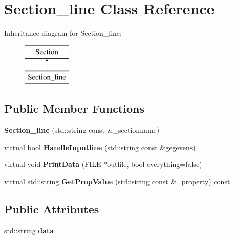 \hypertarget{classSection__line}{\section{Section\-\_\-line Class Reference}
\label{classSection__line}
}
Inheritance diagram for Section\-\_\-line\-:\begin{figure}[H]
\begin{center}
\leavevmode
\includegraphics[height=2.000000cm]{classSection__line}
\end{center}
\end{figure}
\subsection*{Public Member Functions}
\begin{DoxyCompactItemize}
\item 
\hypertarget{classSection__line_ab79823a6ed5b8580e8f197d0c546de55}{{\bfseries Section\-\_\-line} (std\-::string const \&\-\_\-sectionname)}\label{classSection__line_ab79823a6ed5b8580e8f197d0c546de55}

\item 
\hypertarget{classSection__line_ae73d76a18c5953b5f0b857b8f6780d3b}{virtual bool {\bfseries Handle\-Inputline} (std\-::string const \&gegevens)}\label{classSection__line_ae73d76a18c5953b5f0b857b8f6780d3b}

\item 
\hypertarget{classSection__line_abd95883a3bedd227be1d83abf8b17c4f}{virtual void {\bfseries Print\-Data} (F\-I\-L\-E $\ast$outfile, bool everything=false)}\label{classSection__line_abd95883a3bedd227be1d83abf8b17c4f}

\item 
\hypertarget{classSection__line_a774ec5244efc9541ab913762af8c9cf3}{virtual std\-::string {\bfseries Get\-Prop\-Value} (std\-::string const \&\-\_\-property) const }\label{classSection__line_a774ec5244efc9541ab913762af8c9cf3}

\end{DoxyCompactItemize}
\subsection*{Public Attributes}
\begin{DoxyCompactItemize}
\item 
\hypertarget{classSection__line_a9a389941bb8990829a82fb8b41a06b70}{std\-::string {\bfseries data}}\label{classSection__line_a9a389941bb8990829a82fb8b41a06b70}

\end{DoxyCompactItemize}


